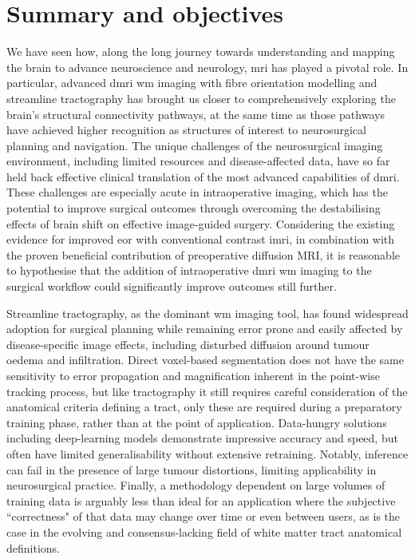 \section{Summary and objectives}
\label{sec:problem}

We have seen how, along the long journey towards understanding and mapping the brain to advance neuroscience and neurology, \gls{mri} has played a pivotal role.
In particular, advanced \gls{dmri} \gls{wm} imaging with fibre orientation modelling and streamline tractography has brought us closer to comprehensively exploring the brain's structural connectivity pathways, at the same time as those pathways have achieved higher recognition as structures of interest to neurosurgical planning and navigation.
The unique challenges of the neurosurgical imaging environment, including limited resources and disease-affected data, have so far held back effective clinical translation of the most advanced capabilities of \gls{dmri}.
These challenges are especially acute in intraoperative imaging, which has the potential to improve surgical outcomes through overcoming the destabilising effects of brain shift on effective image-guided surgery.
Considering the existing evidence for improved \gls{eor} with conventional contrast \gls{imri}, in combination with the proven beneficial contribution of preoperative diffusion MRI, it is reasonable to hypothesise that the addition of intraoperative \gls{dmri} \gls{wm} imaging to the surgical workflow could significantly improve outcomes still further.

Streamline tractography, as the dominant \gls{wm} imaging tool, has found widespread adoption for surgical planning while remaining error prone and easily affected by disease-specific image effects, including disturbed diffusion around tumour oedema and infiltration.
Direct voxel-based segmentation does not have the same sensitivity to error propagation and magnification inherent in the point-wise tracking process, but like tractography it still requires careful consideration of the anatomical criteria defining a tract, only these are required during a preparatory training phase, rather than at the point of application.
Data-hungry solutions including deep-learning models demonstrate impressive accuracy and speed, but often have limited generalisability without extensive retraining.
Notably, inference can fail in the presence of large tumour distortions, limiting applicability in neurosurgical practice.
Finally, a methodology dependent on large volumes of training data is arguably less than ideal for an application where the subjective ``correctness" of that data may change over time or even between users, as is the case in the evolving and consensus-lacking field of white matter tract anatomical definitions.

